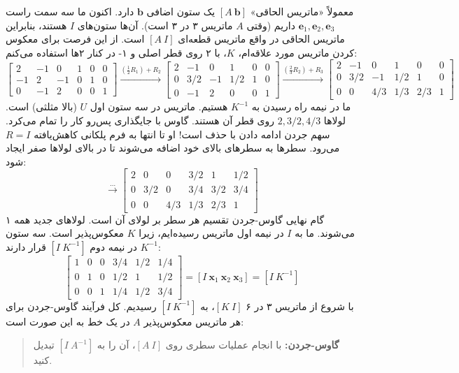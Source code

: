 \documentclass[12pt, a4paper]{book}
\begin{document}
	معمولاً «ماتریس الحاقی» $[A \ \mathbf{b}]$ یک ستون اضافی $\mathbf{b}$ دارد. اکنون ما سه سمت راست $\mathbf{e}_1, \mathbf{e}_2, \mathbf{e}_3$ داریم (وقتی $A$ ماتریس ۳ در ۳ است). آن‌ها ستون‌های $I$ هستند، بنابراین ماتریس الحاقی در واقع ماتریس قطعه‌ای $[A \ I]$ است. از این فرصت برای معکوس کردن ماتریس مورد علاقه‌ام، $K$، با ۲ روی قطر اصلی و ۱- در کنار ۲ها استفاده می‌کنم:
	\[
	\left[ \begin{array}{ccc|ccc}
		2 & -1 & 0 & 1 & 0 & 0 \\
		-1 & 2 & -1 & 0 & 1 & 0 \\
		0 & -1 & 2 & 0 & 0 & 1
	\end{array} \right] \xrightarrow{(\frac{1}{2}R_1)+R_2}
	\left[ \begin{array}{ccc|ccc}
		2 & -1 & 0 & 1 & 0 & 0 \\
		0 & 3/2 & -1 & 1/2 & 1 & 0 \\
		0 & -1 & 2 & 0 & 0 & 1
	\end{array} \right] \xrightarrow{(\frac{2}{3}R_2)+R_3}
	\left[ \begin{array}{ccc|ccc}
		2 & -1 & 0 & 1 & 0 & 0 \\
		0 & 3/2 & -1 & 1/2 & 1 & 0 \\
		0 & 0 & 4/3 & 1/3 & 2/3 & 1
	\end{array} \right]
	\]
	ما در نیمه راه رسیدن به $K^{-1}$ هستیم. ماتریس در سه ستون اول $U$ (بالا مثلثی) است. لولاها $2, 3/2, 4/3$ روی قطر آن هستند. گاوس با جایگذاری پس‌رو کار را تمام می‌کرد. سهم جردن ادامه دادن با حذف است! او تا انتها به فرم پلکانی کاهش‌یافته $R=I$ می‌رود. سطرها به سطرهای بالای خود اضافه می‌شوند تا در بالای لولاها صفر ایجاد شود:
	\[
	\xrightarrow{\dots} \left[ \begin{array}{ccc|ccc}
		2 & 0 & 0 & 3/2 & 1 & 1/2 \\
		0 & 3/2 & 0 & 3/4 & 3/2 & 3/4 \\
		0 & 0 & 4/3 & 1/3 & 2/3 & 1
	\end{array} \right]
	\]
	گام نهایی گاوس-جردن تقسیم هر سطر بر لولای آن است. لولاهای جدید همه ۱ می‌شوند. ما به $I$ در نیمه اول ماتریس رسیده‌ایم، زیرا $K$ معکوس‌پذیر است. سه ستون $K^{-1}$ در نیمه دوم $[I \ K^{-1}]$ قرار دارند:
	\[
	\left[ \begin{array}{ccc|ccc}
		1 & 0 & 0 & 3/4 & 1/2 & 1/4 \\
		0 & 1 & 0 & 1/2 & 1 & 1/2 \\
		0 & 0 & 1 & 1/4 & 1/2 & 3/4
	\end{array} \right] = [I \ \mathbf{x}_1 \ \mathbf{x}_2 \ \mathbf{x}_3] = [I \ K^{-1}]
	\]
	با شروع از ماتریس ۳ در ۶ $[K \ I]$، به $[I \ K^{-1}]$ رسیدیم. کل فرآیند گاوس-جردن برای هر ماتریس معکوس‌پذیر $A$ در یک خط به این صورت است:
	\begin{quote}
		\textbf{گاوس-جردن:} با انجام عملیات سطری روی $[A \ I]$، آن را به $[I \ A^{-1}]$ تبدیل کنید.
	\end{quote}
	
\end{document}
